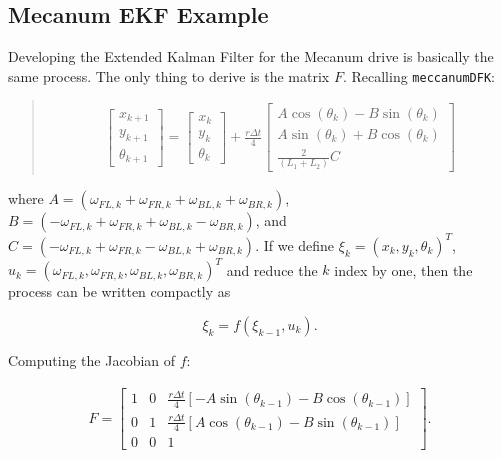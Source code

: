\hypertarget{mecanum-ekf-example}{%
\subsection{Mecanum EKF Example}\label{mecanum-ekf-example}}

Developing the Extended Kalman Filter for the Mecanum drive is basically
the same process. The only thing to derive is the matrix \(F\).
Recalling \texttt{meccanumDFK}:

\begin{quote}
\[\begin{aligned}
\begin{bmatrix} x_{k+1}\\[3mm] y_{k+1}\\[3mm] \theta_{k+1} \end{bmatrix}
=   \begin{bmatrix} x_{k}\\[3mm] y_{k}\\[3mm] \theta_{k} \end{bmatrix} +
\frac{ r\Delta t }{4} \begin{bmatrix} A\cos(\theta_{k})  - B \sin(\theta_{k})   \\[3mm]
A\sin(\theta_{k})  + B \cos(\theta_{k})                     \\[3mm]
                            \frac{2}{(L_1+L_2) } C
         \end{bmatrix}
\end{aligned}\]
\end{quote}

where
\(A = \left( \omega_{FL,k} + \omega_{FR,k} + \omega_{BL,k} + \omega_{BR,k} \right)\),
\(B = \left(-\omega_{FL,k} + \omega_{FR,k} + \omega_{BL,k} - \omega_{BR,k}  \right)\),
and
\(C =  \left( -\omega_{FL,k} + \omega_{FR,k} - \omega_{BL,k} +\omega_{BR,k} \right)\).
If we define \(\xi_k = \left( x_{k} , y_{k} , \theta_{k} \right)^T\),
\(u_k =\left(  \omega_{FL,k} , \omega_{FR,k} , \omega_{BL,k} ,\omega_{BR,k} \right)^T\)
and reduce the \(k\) index by one, then the process can be written
compactly as

\[\xi_{k} = f(\xi_{k-1}, u_k) .\]

Computing the Jacobian of \(f\):

\[\begin{aligned}
F = \begin{bmatrix} 1 & 0 & \frac{ r\Delta t }{4}  \left[ - A\sin(\theta_{k-1})  - B\cos(\theta_{k-1})  \right] \\[3mm]
0 & 1 & \frac{ r\Delta t }{4}  \left[ A \cos(\theta_{k-1})  - B \sin(\theta_{k-1})  \right] \\[3mm]
0 & 0 & 1
\end{bmatrix} .
\end{aligned}\]

